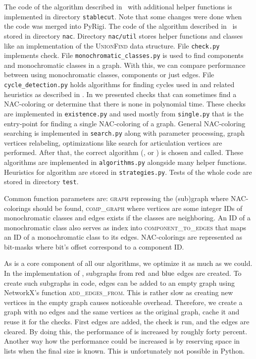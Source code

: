 The code of the algorithm described in~
with additional helper functions is implemented in directory \texttt{stablecut}.
Note that some changes were done when the code was merged into PyRigi.
The code of the algorithm described in~
is stored in directory \texttt{nac}.
Directory \texttt{nac/util} stores helper functions and classes
like an implementation of the \textsc{UnionFind} data structure.
File \texttt{check.py} implements \IsNACColoring{} check.
File \texttt{monochromatic\_classes.py} is used to find \trcon{} components
and monochromatic classes in a graph. With this, we can compare performance
between using monochromatic classes, \trcon{} components or just edges.
File \texttt{cycle\_detection.py} holds algorithms for finding cycles
used in 
and related heuristics as described in .
In 
we presented checks that can sometimes find
a NAC-coloring or determine that there is none in polynomial time.
These checks are implemented in \texttt{existence.py} and
used mostly from \texttt{single.py} that is the entry-point for finding a single NAC-coloring of a graph.
General NAC-coloring searching is implemented in \texttt{search.py}
along with parameter processing, graph vertices relabeling,
optimizations like search for articulation vertices are performed.
After that, the correct algorithm (\Naive{}, \NaiveCycles{} or \Subgraphs{})
is chosen and called.
These algorithms are implemented in \texttt{algorithms.py} alongside many helper functions.
Heuristics for \Subgraphs{} algorithm are stored in \texttt{strategies.py}.
Tests of the whole code are stored in directory \texttt{test}.

Common function parameters are:
\textsc{graph} repressing the (sub)graph where NAC-colorings should be found,
\textsc{comp\_graph} where vertices are some integer IDs of monochromatic classes
and edges exists if the classes are neighboring.
An ID of a monochromatic class also serves as index into \textsc{component\_to\_edges}
that maps an ID of a monochromatic class to its edges.
NAC-colorings are represented as bit-masks where bit's offset correspond to a component ID.

As \IsNACColoring{} is a core component of all our algorithms, we optimize it as much as we could.
In the implementation of \IsNACColoring{}, subgraphs from \( \text{red} \) and \( \text{blue} \) edges are created.
To create such subgraphs in code, edges can be added to an empty graph
using NetworkX's function \textsc{add\_edges\_from}.
This is rather slow as creating new vertices in the empty graph causes noticeable overhead.
Therefore, we create a graph with no edges and the same vertices as the original graph,
cache it and reuse it for the checks. First edges are added, the check is run, and the edges are cleared.
By doing this, the performance of \IsNACColoring{} is increased by roughly forty percent.
Another way how the performance could be increased is by reserving space in lists
when the final size is known. This is unfortunately not possible in Python.

